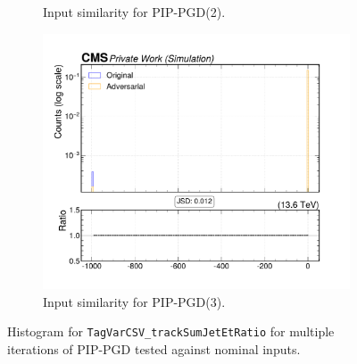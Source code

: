 \begin{figure}[htbp]
\begin{subfigure}[t]{0.32\textwidth}
    \caption*{Input similarity for PIP-PGD(2).}
  \end{subfigure}\hfill
  \begin{subfigure}[t]{0.32\textwidth}
    \includegraphics[width=\linewidth]{media/output/features/compare/combined_it_3/cmp_global_features_TagVarCSV_trackSumJetEtRatio.pdf}
    \caption*{Input similarity for PIP-PGD(3).}
  \end{subfigure}

  \caption*{Histogram for \texttt{TagVarCSV\_trackSumJetEtRatio} for multiple iterations of PIP-PGD tested against nominal inputs.}
  \label{fig:combined_input_TagVarCSV_trackSumJetEtRatio}
\end{figure}

